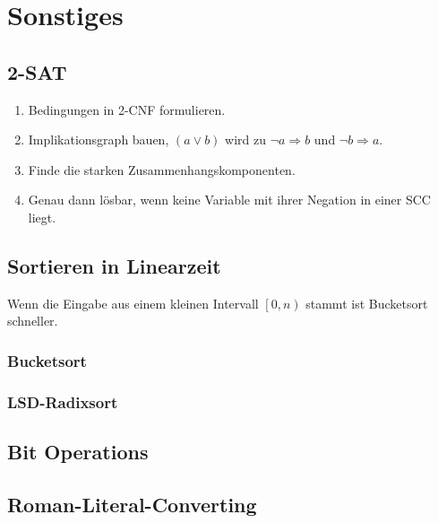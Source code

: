 \section{Sonstiges}

\subsection{2-SAT}
\begin{enumerate}
	\item Bedingungen in 2-CNF formulieren.
	\item Implikationsgraph bauen, $\left(a \vee b\right)$ wird zu $\neg a \Rightarrow b$ und $\neg b \Rightarrow a$.
	\item Finde die starken Zusammenhangskomponenten.
	\item Genau dann lösbar, wenn keine Variable mit ihrer Negation in einer SCC liegt.
\end{enumerate}

\subsection{Sortieren in Linearzeit}
Wenn die Eingabe aus einem kleinen Intervall $\left[0, n\right)$ stammt ist Bucketsort schneller.

\subsubsection{Bucketsort}


\subsubsection{LSD-Radixsort}


\subsection{Bit Operations}


\subsection{Roman-Literal-Converting}


